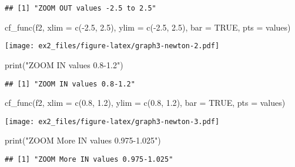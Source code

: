 \documentclass[
]{article}
\newenvironment{Shaded}{\begin{snugshade}}{\end{snugshade}}
\newcommand{\AttributeTok}[1]{\textcolor[rgb]{0.77,0.63,0.00}{#1}}
\newcommand{\ConstantTok}[1]{\textcolor[rgb]{0.00,0.00,0.00}{#1}}
\newcommand{\FloatTok}[1]{\textcolor[rgb]{0.00,0.00,0.81}{#1}}
\newcommand{\FunctionTok}[1]{\textcolor[rgb]{0.00,0.00,0.00}{#1}}
\newcommand{\NormalTok}[1]{#1}
\newcommand{\SpecialCharTok}[1]{\textcolor[rgb]{0.00,0.00,0.00}{#1}}
\newcommand{\StringTok}[1]{\textcolor[rgb]{0.31,0.60,0.02}{#1}}
\begin{document}
\begin{verbatim}
## [1] "ZOOM OUT values -2.5 to 2.5"
\end{verbatim}

\begin{Shaded}
\begin{Highlighting}[]
\FunctionTok{cf\_func}\NormalTok{(f2, }\AttributeTok{xlim =} \FunctionTok{c}\NormalTok{(}\SpecialCharTok{{-}}\FloatTok{2.5}\NormalTok{, }\FloatTok{2.5}\NormalTok{), }\AttributeTok{ylim =} \FunctionTok{c}\NormalTok{(}\SpecialCharTok{{-}}\FloatTok{2.5}\NormalTok{, }\FloatTok{2.5}\NormalTok{), }\AttributeTok{bar =} \ConstantTok{TRUE}\NormalTok{, }\AttributeTok{pts =}\NormalTok{ values)}
\end{Highlighting}
\end{Shaded}

\texttt{[image: ex2\_files/figure-latex/graph3-newton-2.pdf]}

\begin{Shaded}
\begin{Highlighting}[]
\FunctionTok{print}\NormalTok{(}\StringTok{"ZOOM IN values 0.8{-}1.2"}\NormalTok{)}
\end{Highlighting}
\end{Shaded}

\begin{verbatim}
## [1] "ZOOM IN values 0.8-1.2"
\end{verbatim}

\begin{Shaded}
\begin{Highlighting}[]
\FunctionTok{cf\_func}\NormalTok{(f2, }\AttributeTok{xlim =} \FunctionTok{c}\NormalTok{(}\FloatTok{0.8}\NormalTok{, }\FloatTok{1.2}\NormalTok{), }\AttributeTok{ylim =} \FunctionTok{c}\NormalTok{(}\FloatTok{0.8}\NormalTok{, }\FloatTok{1.2}\NormalTok{), }\AttributeTok{bar =} \ConstantTok{TRUE}\NormalTok{, }\AttributeTok{pts =}\NormalTok{ values)}
\end{Highlighting}
\end{Shaded}

\texttt{[image: ex2\_files/figure-latex/graph3-newton-3.pdf]}

\begin{Shaded}
\begin{Highlighting}[]
\FunctionTok{print}\NormalTok{(}\StringTok{"ZOOM More IN values 0.975{-}1.025"}\NormalTok{)}
\end{Highlighting}
\end{Shaded}

\begin{verbatim}
## [1] "ZOOM More IN values 0.975-1.025"
\end{verbatim}
\end{document}

